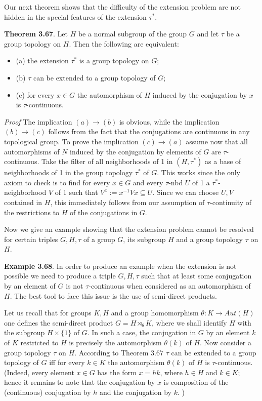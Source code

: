 \documentclass[12pt]{article}
\begin{document}
    Our next theorem shows that the difficulty of the extension problem are not hidden in the special features
of the extension $\tau^*$.


\textbf{Theorem 3.67}. Let $H$ be a normal subgroup of the group $G$ and let $\tau$ be a group topology on $H$. Then the
following are equivalent:


    \begin{itemize}

        \item (a) the extension $τ^*$ is a group topology on $G$;

        \item (b) $\tau$ can be extended to a group topology of $G$;

        \item (c) for every $x \in G$ the automorphism of $H$ induced by the conjugation by $x$ is $\tau$-continuous.

    \end{itemize}


\emph{Proof} The implication $(a) \to (b)$ is obvious, while the implication $(b) \to (c)$ follows from the fact that the
conjugations are continuous in any topological group. To prove the implication $(c) \to (a)$ assume now that
all automorphisms of $N$ induced by the conjugation by elements of $G$ are $\tau$-continuous. Take the filter of all
neighborhoods of 1 in $(H, τ^*)$ as a base of neighborhoods of 1 in the group topology $τ^*$ of $G$. This works since
the only axiom to check is to find for every $x \in G$ and every $\tau$-nbd $U$ of 1 a $τ^*$-neighborhood $V$ of 1 such that
$V^x:= x^{-1} V x \subseteq U$. Since we can choose $U, V$ contained in $H$, this immediately follows from our assumption of
$\tau$-continuity of the restrictions to $H$ of the conjugations in $G$.


    Now we give an example showing that the extension problem cannot be resolved for certain triples $G, H, \tau$
of a group $G$, its subgroup $H$ and a group topology $\tau$ on $H$.


\textbf{Example 3.68}. In order to produce an example when the extension is not possible we need to produce a triple
$G, H, \tau$ such that at least some conjugation by an element of $G$ is not $\tau$-continuous when considered as an
automorphism of $H$. The best tool to face this issue is the use of semi-direct products.


    Let us recall that for groups $K, H$ and a group homomorphism $\theta : K \to Aut(H)$ one defines the semi-direct
product $G = H \rtimes_\theta K$, where we shall identify $H$ with the subgroup $H \times \{1\}$ of $G$. In such a case, the conjugation  
in $G$ by an element $k$ of $K$ restricted to $H$ is precisely the automorphism $\theta(k)$ of $H$. Now consider a group
topology $\tau$ on $H$. According to Theorem 3.67 $\tau$ can be extended to a group topology of $G$ iff for every $k \in K$
the automorphism $\theta(k)$ of $H$ is $\tau$-continuous. (Indeed, every element $x \in G$ has the form $x = hk$, where $h \in H$
and $k \in K$; hence it remains to note that the conjugation by $x$ is composition of the (continuous) conjugation
by $h$ and the conjugation by $k$. )
\end{document}

